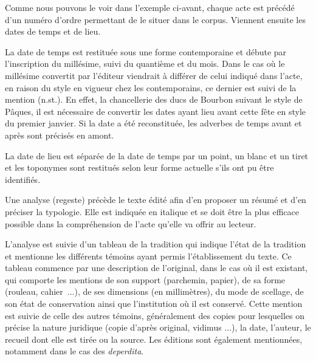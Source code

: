 \newpage 

\par Comme nous pouvons le voir dans l'exemple ci-avant, chaque acte est précédé d'un numéro d'ordre permettant de le situer dans le corpus. Viennent ensuite les dates de temps et de lieu. 
\newline 

\par La date de temps est restituée sous une forme contemporaine et débute par l'inscription du millésime, suivi du quantième et du mois. Dans le cas où le millésime convertit par l'éditeur viendrait à différer de celui indiqué dans l'acte, en raison du style en vigueur chez les contemporains, ce dernier est suivi de la mention (n.st.). En effet, la chancellerie des ducs de Bourbon suivant le style de Pâques, il est nécessaire de convertir les dates ayant lieu avant cette fête en style du premier janvier. Si la date a été reconstituée, les adverbes de temps \og avant \fg \space et \og après \fg \space sont précisés en amont. 
\newline 

\par La date de lieu est séparée de la date de temps par un point, un blanc et un tiret et les toponymes sont restitués selon leur forme actuelle s'ils ont pu être identifiés. 
\newline 

\par Une analyse (regeste) précède le texte édité afin d'en proposer un résumé et d'en préciser la typologie. Elle est indiquée en italique et se doit être la plus efficace possible dans la compréhension de l'acte qu'elle va offrir au lecteur. 
\newline 

\par L'analyse est suivie d'un tableau de la tradition qui indique l'état de la tradition et mentionne les différents témoins ayant permis l'établissement du texte. Ce tableau commence par une description de l'original, dans le cas où il est existant, qui comporte les mentions de son support (parchemin, papier), de sa forme (rouleau, cahier~...), de ses dimensions (en millimètres), du mode de scellage, de son état de conservation ainsi que l'institution où il est conservé. Cette mention est suivie de celle des autres témoins, généralement des copies pour lesquelles on précise la nature juridique (copie d'après original, vidimus ...), la date, l'auteur, le recueil dont elle est tirée ou la source. Les éditions sont également mentionnées, notamment dans le cas des \textit{deperdita}. 
\newline 

